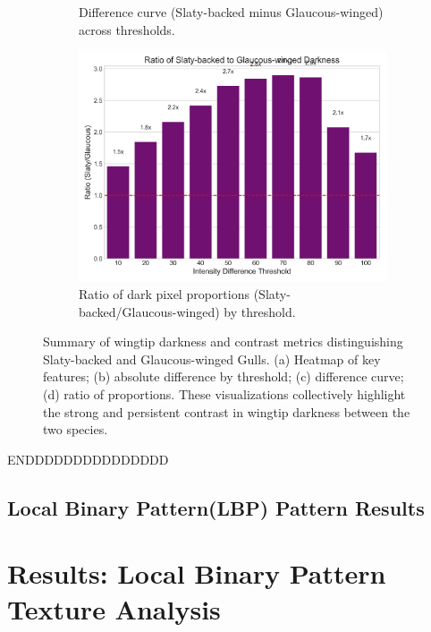 \documentclass[a4paper,12pt]{report}
\begin{document}
\begin{figure}[H]
\begin{subfigure}[b]{0.48\textwidth}
        \caption{Difference curve (Slaty-backed minus Glaucous-winged) across thresholds.}
        \label{fig:diff_curve}
    \end{subfigure}
    \hfill
    \begin{subfigure}[b]{0.48\textwidth}
        \centering
        \includegraphics[width=\textwidth]{images/REPORT_IMAGES_INTENSITY/I1/ratiogwgsbgdarkness.png}
        \caption{Ratio of dark pixel proportions (Slaty-backed/Glaucous-winged) by threshold.}
        \label{fig:ratio_plot}
    \end{subfigure}
    \caption{Summary of wingtip darkness and contrast metrics distinguishing Slaty-backed and Glaucous-winged Gulls. (a) Heatmap of key features; (b) absolute difference by threshold; (c) difference curve; (d) ratio of proportions. These visualizations collectively highlight the strong and persistent contrast in wingtip darkness between the two species.}
    \label{fig:wingtip_darkness_summary}
\end{figure}

 ENDDDDDDDDDDDDDDD

\subsection{Local Binary Pattern(LBP) Pattern Results}

\section{Results: Local Binary Pattern Texture Analysis}
\label{sec:lbp_results}
\end{document}
